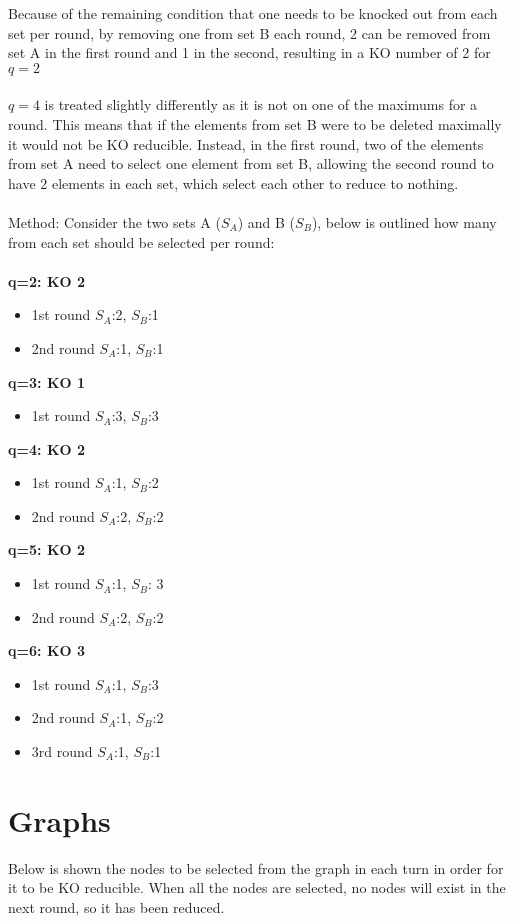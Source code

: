 \documentclass{article}[18pt]
\begin{document}
\begin{enumerate}
Because of the remaining condition that one needs to be knocked out from each set per round, by removing one from set B each round, 2 can be removed from set A in the first round and 1 in the second, resulting in a KO number of 2 for $q=2$ \\
\\
$q=4$ is treated slightly differently as it is not on one of the maximums for a round. This means that if the elements from set B were to be deleted maximally it would not be KO reducible. Instead, in the first round, two of the elements from set A need to select one element from set B, allowing the second round to have 2 elements in each set, which select each other to reduce to nothing.\\
\\
Method:
Consider the two sets A ($S_A$) and B ($S_B$), below is outlined how many from each set should be selected per round:\\
\\
\textbf{q=2: KO 2}
\begin{itemize}
	\item 1st round $S_A$:2, $S_B$:1
	\item 2nd round $S_A$:1, $S_B$:1
\end{itemize}
\textbf{q=3: KO 1}
\begin{itemize}
	\item 1st round $S_A$:3, $S_B$:3
\end{itemize}
\textbf{q=4: KO 2}
\begin{itemize}
	\item 1st round $S_A$:1, $S_B$:2
	\item 2nd round $S_A$:2, $S_B$:2
\end{itemize}
\textbf{q=5: KO 2}
\begin{itemize}
	\item 1st round $S_A$:1, $S_B$: 3
	\item 2nd round $S_A$:2, $S_B$:2
\end{itemize}
\textbf{q=6: KO 3}
\begin{itemize}
	\item 1st round $S_A$:1, $S_B$:3
	\item 2nd round $S_A$:1, $S_B$:2
	\item 3rd round $S_A$:1, $S_B$:1
\end{itemize}
\newpage
\section{Graphs}
Below is shown the nodes to be selected from the graph in each turn in order for it to be KO reducible. When all the nodes are selected, no nodes will exist in the next round, so it has been reduced.

\end{enumerate}
\end{document}
